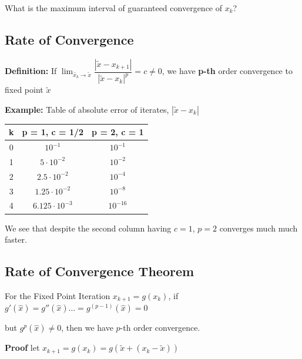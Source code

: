 \documentclass{article}
\begin{document}
What is the maximum interval of guaranteed convergence of $x_k$?

\subsection{Rate of Convergence}

\textbf{Definition:} If $\displaystyle \lim_{\tilde{x_k} \to \tilde{x}} \dfrac{| \tilde{x} - x_{k + 1} |}{| \tilde{x} - x_k |^p} = c \neq 0$, we have \textbf{p-th} order convergence to fixed point $\tilde{x}$ 

\textbf{Example:}  Table of absolute error of iterates, $| \tilde{x} - x_k|$

\hspace{2cm} \begin{tabular}{c|c|c}
  k  & p = 1, c = 1/2 & p = 2, c = 1\\
  \hline
 0  & $10^{-1}$ & $10^{-1}$\\
 1  & $5 \cdot 10^{-2}$ & $10^{-2}$\\
 2  & $2.5 \cdot 10^{-2}$ & $10^{-4}$\\
 3  & $1.25 \cdot 10^{-2}$ & $10^{-8}$\\
 4  & $6.125 \cdot 10^{-3}$ & $10^{-16}$\\
\end{tabular}

We see that despite the second column having $c = 1$, $p = 2$ converges much much faster.

\vspace{0.2cm}

\pagebreak

\text{}

\vspace{-0.7cm}

\subsection{Rate of Convergence Theorem}

\vspace{0.1cm}

For the Fixed Point Iteration $x_{k + 1} = g(x_k)$, if $g'(\hat{x}) = g''(\hat{x}) \dots = g^{(p - 1)} (\hat{x}) = 0$

but $g^p (\hat{x}) \neq 0$, then we have $p$-th order convergence.

\vspace{0.2cm}

\textbf{Proof} let $x_{k + 1} = g(x_k) = g(\tilde{x} + (x_k - \tilde{x}))$ 
\end{document}
